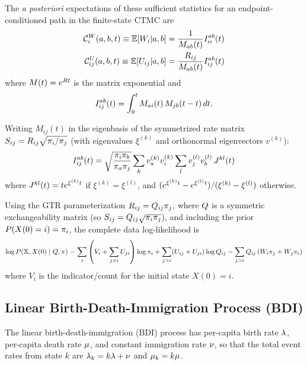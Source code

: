 The {\em a posteriori} expectations of these sufficient statistics
for an endpoint-conditioned path in the finite-state CTMC are
\cite{HolmesRubin2002,HobolthJensen2005,HobolthJensen2011,TataruHobolth2011}
\begin{align}
\mathcal{C}^W_i(a,b,t) \equiv \mathbb{E}[W_i|a,b] &= \frac{1}{M_{ab}(t)} I^{ab}_{ii}(t) \label{eq:em-dwell} \\
\mathcal{C}^U_{ij}(a,b,t) \equiv \mathbb{E}[U_{ij}|a,b] &= \frac{R_{ij}}{M_{ab}(t)} I^{ab}_{ij}(t) \label{eq:em-counts}
\end{align}
where $M(t) = e^{R t}$ is the matrix exponential and
\begin{equation}\label{eq:em-integral}
I^{ab}_{ij}(t) = \int_0^t M_{ai}(t)\, M_{jb}(t-t)\, dt.
\end{equation}

Writing $M_{ij}(t)$ in the eigenbasis of the symmetrized rate matrix
$S_{ij} = R_{ij}\sqrt{\pi_i/\pi_j}$ (with eigenvalues $\xi^{(k)}$
and orthonormal eigenvectors $v^{(k)}$):
\begin{equation}\label{eq:em-Jkl}
I^{ab}_{ij}(t) = \sqrt{\frac{\pi_i \pi_b}{\pi_a \pi_j}}
\sum_k v_a^{(k)} v_i^{(k)} \sum_l v_j^{(l)} v_b^{(l)}\, J^{kl}(t)
\end{equation}
where $J^{kl}(t) = t e^{\xi^{(k)}t}$ if $\xi^{(k)} = \xi^{(l)}$,
and $(e^{\xi^{(k)}t} - e^{\xi^{(l)}t})/(\xi^{(k)} - \xi^{(l)})$ otherwise.

Using the GTR parameterization $R_{ij} = Q_{ij} \pi_j$, where $Q$ is a symmetric exchangeability matrix (so $S_{ij} = Q_{ij} \sqrt{\pi_i \pi_j}$), and including the prior $P(X(0)=i) = \pi_i$, the complete data log-likelihood is
\[
\log P(\mathbb{X}, X(0) \mid Q, \pi) =
\sum_i \left( V_i + \sum_{j \neq i} U_{ji} \right) \log \pi_i + \sum_{j>i} (U_{ij} + U_{ji}) \log Q_{ij} - \sum_{j > i} Q_{ij} \left( W_i \pi_j + W_j \pi_i \right)
\]
where $V_i$ is the indicator/count for the initial state $X(0) = i$.

\subsection{Linear Birth-Death-Immigration Process (BDI)}
\label{sec:bdi}

The linear birth-death-immigration (BDI) process \cite{Kendall1948} has per-capita birth rate
$\lambda$, per-capita death rate $\mu$, and constant immigration rate $\nu$,
so that the total event rates from state $k$ are $\lambda_k = k\lambda + \nu$ and
$\mu_k = k\mu$.

